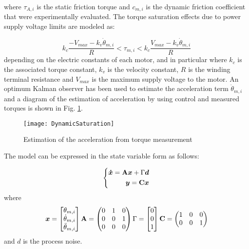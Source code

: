 where $\tau_{A,i}$ is the static friction torque and $c_{m,i}$ is the dynamic friction coefficient that were experimentally evaluated.
The torque saturation effects due to power supply voltage limits are modeled as:

\begin{equation}
k_c\frac{-V_{max}-k_v\dot{\theta}_{m,i}}{R}<\tau_{m,i}<k_c\frac{V_{max}-k_v\dot{\theta}_{m,i}}{R}
\label{torque_saturation}
\end{equation}
depending on the electric constants of each motor, and in particular  where $k_c$ is the associated torque constant, $k_v$ is the velocity constant, $R$ is the winding terminal resistance and $V_{max}$ is the maximum supply voltage to the motor.
An optimum Kalman observer has been used to estimate the acceleration term $\ddot{\theta}_{m,i}$ and a diagram of the estimation of acceleration by using control and measured torques is shown in Fig. \ref{fig:acc_estimation}.

\begin{figure}[htb]
	\centering
	\texttt{[image: DynamicSaturation]}
	\caption{Estimation of the acceleration from torque measurement}
	\label{fig:acc_estimation}
\end{figure}
%
%

The model can be expressed in the state variable form as follows:
%

\begin{equation}
\left \{
\begin{aligned}
{ \boldsymbol {\dot{x}}}=\mathbf{A}{ \boldsymbol {x}} + {\Gamma }{ \boldsymbol {d}} \\
{ \boldsymbol {y}}=\mathbf{C}{ \boldsymbol {x}}
\end{aligned}
\right .
\end{equation}
%
where
%
\begin{equation}
\begin{aligned}
{ \boldsymbol {x}}=\begin{bmatrix}  {\theta_{m,i}} \\ \dot{\theta}_{m,i} \\ \ddot{\theta}_{m,i} \end{bmatrix}
\mathbf{A}=\begin{pmatrix} 0 & 1 & 0  \\
	0 & 0 & 1 \\
	0 & 0 & 0  \end{pmatrix}
{\Gamma }=\begin{bmatrix}  0 \\ 0 \\ 1 \end{bmatrix}
\mathbf{C}=\begin{pmatrix} 1 & 0 & 0  \\
	0 & 0 & 1 \end{pmatrix} 
\end{aligned}
\end{equation}
%
and $d$ is the process noise.

